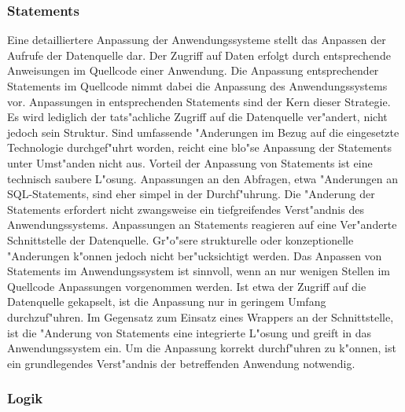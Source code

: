 \subsubsection{Statements}

Eine detailliertere Anpassung der Anwendungssysteme stellt das Anpassen der Aufrufe der Datenquelle dar. Der Zugriff auf Daten erfolgt durch entsprechende Anweisungen im Quellcode einer Anwendung. Die Anpassung entsprechender Statements im Quellcode nimmt dabei die Anpassung des Anwendungssystems vor. Anpassungen in entsprechenden Statements sind der Kern dieser Strategie. Es wird lediglich der tats"achliche Zugriff auf die Datenquelle ver"andert, nicht jedoch sein Struktur. Sind umfassende "Anderungen im Bezug auf die eingesetzte Technologie durchgef"uhrt worden, reicht eine blo"se Anpassung der Statements unter Umst"anden nicht aus.
\lb
Vorteil der Anpassung von Statements ist eine technisch saubere L"osung. Anpassungen an den Abfragen, etwa "Anderungen an SQL-Statements, sind eher simpel in der Durchf"uhrung. Die "Anderung der Statements erfordert nicht zwangsweise ein tiefgreifendes Verst"andnis des Anwendungssystems. 
\lb
Anpassungen an Statements reagieren auf eine Ver"anderte Schnittstelle der Datenquelle. Gr"o"sere strukturelle oder konzeptionelle "Anderungen k"onnen jedoch nicht ber"ucksichtigt werden.
\lb
Das Anpassen von Statements im Anwendungssystem ist sinnvoll, wenn an nur wenigen Stellen im Quellcode Anpassungen vorgenommen werden. Ist etwa der Zugriff auf die Datenquelle gekapselt, ist die Anpassung nur in geringem Umfang durchzuf"uhren. Im Gegensatz zum Einsatz eines Wrappers an der Schnittstelle, ist die "Anderung von Statements eine integrierte L"osung und greift in das Anwendungssystem ein. Um die Anpassung korrekt durchf"uhren zu k"onnen, ist ein grundlegendes Verst"andnis der betreffenden Anwendung notwendig.

\subsubsection{Logik}

